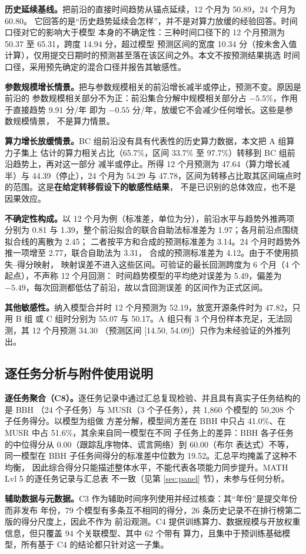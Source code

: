 \textbf{历史延续基线。}把前沿的直接时间趋势从锚点延续，12 个月为 50.89，24 个月为 60.80。
它回答的是“历史趋势延续会怎样”，并不是对算力放缓的经验回答。时间口径对它的影响大于模型
本身的不确定性：三种时间口径下的 12 个月预测为 50.37 至 65.31，跨度 14.94 分，超过模型
预测区间的宽度 10.34 分（按未舍入值计算），仅用提交日期时的预测甚至落在该区间之外。本文不按预测结果挑选
时间口径，采用预先确定的混合口径并报告其敏感性。

\textbf{参数规模增长情景。}把与参数规模相关的前沿增长减半或停止，预测不变。原因是前沿的
参数规模相关部分不为正：前沿集合分解中规模相关部分占 $-5.5\%$，作用于直接趋势 9.91 分/年
即为 $-0.55$ 分/年，放缓它不会减少任何增长。这些是参数规模情景，
不是算力情景。

\textbf{算力增长放缓情景。}BC 组前沿没有具有代表性的历史算力数据，本文把 A 组算力子集上
估计的算力相关占比（65.7\%，区间 33.7\% 至 97.7\%）转移到 BC 组前沿趋势上，再对这一部分
减半或停止。所得 12 个月预测为 47.64（算力增长减半）与 44.39（停止），24 个月为 54.29 与
47.78，区间为转移占比取其区间端点时的范围。这是\textbf{在给定转移假设下的敏感性结果}，
不是已识别的总体效应，也不是因果效应。

\textbf{不确定性构成。}以 12 个月为例（标准差，单位为分），前沿水平与趋势外推两项分别为
0.81 与 1.39，整个前沿拟合的联合自助法标准差为 1.97；各月前沿点围绕拟合线的离散为 2.45；
二者按平方和合成的预测标准差为 3.14。24 个月时趋势外推一项增至 2.77，联合自助法为 3.31，
合成的预测标准差为 4.12。由于不使用损失–得分映射，
映射误差不进入这些区间。可验证的最长回测跨度为 6 个月（4 个起点），不声称 12 个月回测：
时间趋势模型的平均绝对误差为 5.49，偏差为 $-5.49$，每次回测都低估了前沿，故以含回测误差
的区间作为正式区间。

\textbf{其他敏感性。}纳入模型合并时 12 个月预测为 52.19，放宽开源条件时为 47.82，只用 B 组
或 C 组时分别为 55.07 与 50.17。A 组只有 3 个月份样本充足，无法回测，其 12 个月预测 34.30
（预测区间 [14.50, 54.09]）只作为未经验证的外推列出。

\subsection{逐任务分析与附件使用说明}

\textbf{逐任务聚合（C8）。}逐任务记录中通过汇总复现检验、并且具有真实子任务结构的是 BBH
（24 个子任务）与 MUSR（3 个子任务），共 1,860 个模型的 50,208 个子任务得分。以模型为组做
方差分解，模型间方差在 BBH 中只占 41.0\%、在 MUSR 中占 51.6\%，其余来自同一模型在不同
子任务上的差异：BBH 各子任务的中位得分从 0.00（跟踪乱序物体、谎言网络）到 60.00（布尔
表达式）不等，同一模型在 BBH 子任务间得分的标准差中位数为 19.52。汇总平均掩盖了这种不均衡，
因此综合得分只能描述整体水平，不能代表各项能力同步提升。MATH Lvl 5 的逐任务记录与汇总表
不一致（见第 \ref{sec:panel} 节），未参与任何分析。

\textbf{辅助数据与元数据。}C3 作为辅助时间序列使用并经过核查：其“年份”是提交年份而非发布
年份，79 个模型有多条互不相同的得分，26 条历史记录不在排行榜第二版的得分尺度上，因此不作为
前沿观测。C4 提供训练算力、数据规模与开放权重信息，但只覆盖 94 个关联模型、其中 62 个带有
算力，且集中于预训练基础模型，所有基于 C4 的结论都只针对这一子集。
